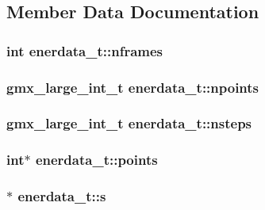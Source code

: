 \subsection{\-Member \-Data \-Documentation}
\hypertarget{structenerdata__t_abc8698bcd3c339c6c1ec9890ca5c43db}{
\subsubsection[{nframes}]{\setlength{\rightskip}{0pt plus 5cm}int {\bf enerdata\-\_\-t\-::nframes}}}\label{structenerdata__t_abc8698bcd3c339c6c1ec9890ca5c43db}
\hypertarget{structenerdata__t_a7b89847f7885a2e96b4a155cc115b4d0}{
\subsubsection[{npoints}]{\setlength{\rightskip}{0pt plus 5cm}gmx\-\_\-large\-\_\-int\-\_\-t {\bf enerdata\-\_\-t\-::npoints}}}\label{structenerdata__t_a7b89847f7885a2e96b4a155cc115b4d0}
\hypertarget{structenerdata__t_a7d5406fd186b3dbda4b369e28a686892}{
\subsubsection[{nsteps}]{\setlength{\rightskip}{0pt plus 5cm}gmx\-\_\-large\-\_\-int\-\_\-t {\bf enerdata\-\_\-t\-::nsteps}}}\label{structenerdata__t_a7d5406fd186b3dbda4b369e28a686892}
\hypertarget{structenerdata__t_a665529cf8054436be084db2860fe380b}{
\subsubsection[{points}]{\setlength{\rightskip}{0pt plus 5cm}int$\ast$ {\bf enerdata\-\_\-t\-::points}}}\label{structenerdata__t_a665529cf8054436be084db2860fe380b}
\hypertarget{structenerdata__t_abdb22705be9e317bd25c88a9eac57db0}{
\subsubsection[{s}]{$\ast$ {\bf enerdata\-\_\-t\-::s}}}\label{structenerdata__t_abdb22705be9e317bd25c88a9eac57db0}
